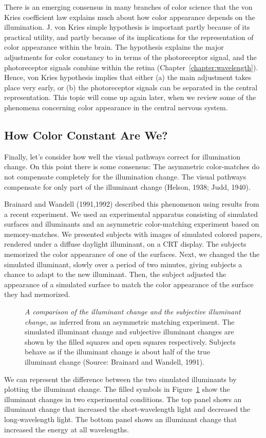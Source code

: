 There is an emerging consensus in many branches of color science that the
von Kries coefficient law explains much about how color appearance
depends on the illumination.  J. von Kries simple hypothesis is
important partly because of its practical utility, and partly because
of its implications for the representation of color appearance within
the brain.  The hypothesis explains the major adjustments for color
constancy to in terms of the photoreceptor signal, and the
photoreceptor signals combine within the retina
(Chapter~\ref{chapter:wavelength}).  Hence, von Kries hypothesis
implies that either (a) the main adjustment takes place very early, or
(b) the photoreceptor signals can be separated in the central
representation.  This topic will come up again later, when we review
some of the phenomena concerning color appearance in the central
nervous system.

\subsection*{How Color Constant Are We?}
Finally, let's consider how well the visual pathways correct for
illumination change.  On this point there is some consensus: The
asymmetric color-matches do not compensate completely for the
illumination change.  The visual pathways compensate for only part of
the illuminant change (Helson, 1938; Judd, 1940).

Brainard and Wandell (1991,1992) described this phenomenon using results
from a recent experiment.  We used an experimental apparatus
consisting of simulated surfaces and illuminants and an asymmetric
color-matching experiment based on memory-matches.  We presented
subjects with images of simulated colored papers, rendered under a
diffuse daylight illuminant, on a CRT display.  The subjects memorized
the color appearance of one of the surfaces.  Next, we changed the the
simulated illuminant, slowly over a period of two minutes, giving
subjects a chance to adapt to the new illuminant.  Then, the subject
adjusted the appearance of a simulated surface to match the color
appearance of the surface they had memorized.

\begin{figure}
\centerline{
}
\caption[Equivalent Illuminant]{
{\em A comparison of the illuminant change and the subjective
illuminant change}, as inferred from an asymmetric matching
experiment.  The simulated illuminant change and subjective illuminant
changes are shown by the filled squares and open squares respectively.
Subjects behave as if the illuminant change is about half of the true
illuminant change (Source: Brainard and Wandell, 1991).  }
\label{f8:equivIll}
\end{figure}
We can represent the difference between the two simulated illuminants
by plotting the illuminant change.  The filled symbols in
Figure~\ref{f8:equivIll} show the illuminant changes in two
experimental conditions.  The top panel shows an illuminant change
that increased the short-wavelength light and decreased the
long-wavelength light.  The bottom panel shows an illuminant change
that increased the energy at all wavelengths.

